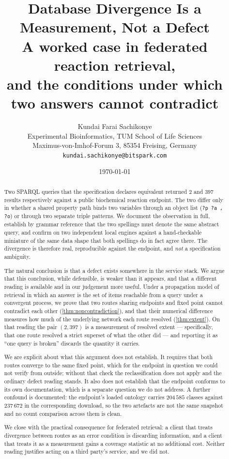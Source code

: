 \documentclass[11pt,a4paper]{article}
\title{\textbf{Database Divergence Is a Measurement, Not a Defect}\\[0.4em]
\large A worked case in federated reaction retrieval,\\
and the conditions under which two answers cannot contradict}
\author{%
Kundai Farai Sachikonye\\[0.3em]
\normalsize Experimental Bioinformatics, TUM School of Life Sciences\\
\normalsize Maximus-von-Imhof-Forum 3, 85354 Freising, Germany\\
\normalsize \texttt{kundai.sachikonye@bitspark.com}}
\date{\today}
\theoremstyle{plain}
\theoremstyle{definition}
\theoremstyle{remark}
\begin{document}
\maketitle

\begin{abstract}
Two SPARQL queries that the specification declares equivalent returned $2$ and
$397$ results respectively against a public biochemical reaction endpoint. The
two differ only in whether a shared property path binds two variables through an
object list (\texttt{?p ?a , ?o}) or through two separate triple patterns. We
document the observation in full, establish by grammar reference that the two
spellings must denote the same abstract query, and confirm on two independent
local engines against a hand-checkable miniature of the same data shape that
both spellings do in fact agree there. The divergence is therefore real,
reproducible against the endpoint, and \emph{not} a specification ambiguity.

The natural conclusion is that a defect exists somewhere in the service stack.
We argue that this conclusion, while defensible, is weaker than it appears, and
that a different reading is available and in our judgement more useful. Under a
propagation model of retrieval in which an answer is the set of items reachable
from a query under a convergent process, we prove that two routes sharing
endpoints and fixed point cannot contradict each other
(\cref{thm:noncontradiction}), and that their numerical difference measures how
much of the underlying network each route resolved
(\cref{thm:extent}). On that reading the pair $(2,397)$ is a measurement of
resolved extent --- specifically, that one route resolved a strict superset of
what the other did --- and reporting it as ``one query is broken'' discards the
quantity it carries.

We are explicit about what this argument does not establish. It requires that
both routes converge to the same fixed point, which for the endpoint in question
we could not verify from outside; without that check the reclassification does
not apply and the ordinary defect reading stands. It also does not establish
that the endpoint conforms to its own documentation, which is a separate
question we do not address. A further confound is documented: the endpoint's
loaded ontology carries $204\,585$ classes against $237\,672$ in the
corresponding download, so the two artefacts are not the same snapshot and no
count comparison across them is clean.

We close with the practical consequence for federated retrieval: a client that
treats divergence between routes as an error condition is discarding
information, and a client that treats it as a measurement gains a coverage
statistic at no additional cost. Neither reading justifies acting on a third
party's service, and we did not.
\end{abstract}
\end{document}

